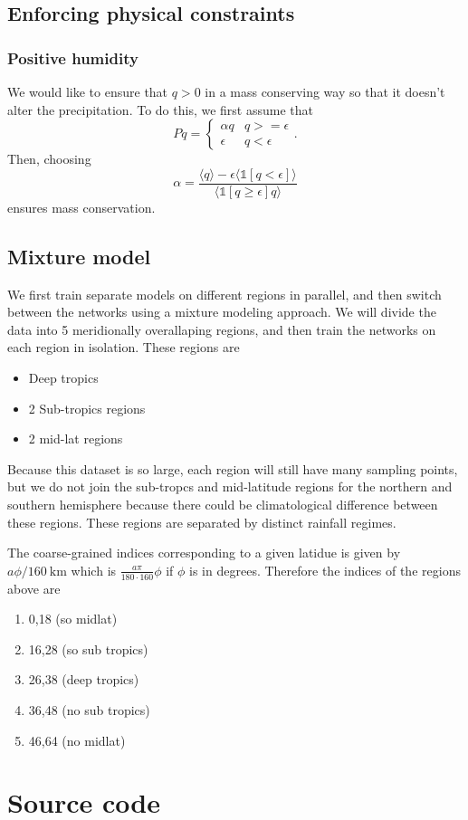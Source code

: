 \documentclass{report}
\newcommand{\1}[1]{\mathds{1}\left[#1\right]}
\begin{document}
\section{Enforcing physical constraints}

\subsection{Positive humidity}

We would like to ensure that $q> 0$ in a mass conserving way so that it doesn't alter the precipitation.
To do this, we first assume that
\[ Pq =
  \begin{cases}
    \alpha q & q >= \epsilon \\
    \epsilon & q < \epsilon
  \end{cases}.
\]
Then, choosing
\[\alpha = \frac{\langle q \rangle - \epsilon \langle \1{q < \epsilon} \rangle}{\langle \1{q \geq \epsilon} q \rangle}\]
ensures mass conservation.

\section{Mixture model}

We first train separate models on different regions in parallel, and then switch between the networks using a mixture modeling approach.
We will divide the data into 5 meridionally overallaping regions, and then train the networks on each region in isolation. These regions are
\begin{itemize}
\item Deep tropics
\item 2 Sub-tropics regions
\item 2 mid-lat regions
\end{itemize}
Because this dataset is so large, each region will still have many sampling points, but we do not join the sub-tropcs and mid-latitude regions for the northern and southern hemisphere because there could be climatological difference between these regions.
These regions are separated by distinct rainfall regimes.

The coarse-grained indices corresponding to a given latidue is given by $a \phi / \SI{160}{\km}$ which is $\frac{a\pi}{180 \cdot 160} \phi $ if $\phi$ is in degrees. Therefore the indices of the regions above are
\begin{enumerate}
\item 0,18 (so midlat)
\item 16,28 (so sub tropics)
\item 26,38 (deep tropics)
\item 36,48 (no sub tropics)
\item 46,64 (no midlat)
\end{enumerate} 

\printbibliography
\appendix

\chapter{Source code}
\label{sec:source}

% 
\end{document}
